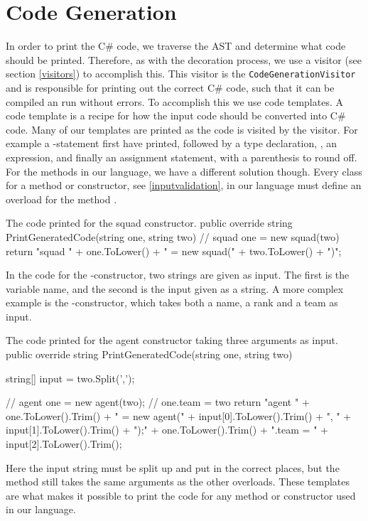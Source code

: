\section{Code Generation}
In order to print the C\# code, we traverse the AST and determine what code should be printed. 
Therefore, as with the decoration process, we use a visitor (see section \ref{visitors}) to accomplish this.
This visitor is the \texttt{CodeGenerationVisitor} and is responsible for printing out the correct C\# code, such that it can be compiled an run without errors. 
To accomplish this we use code templates. \newline
A code template is a recipe for how the input code should be converted into C\# code. 
Many of our templates are printed as the code is visited by the visitor. 
For example a -statement first have  printed, followed by a type declaration, , an expression,  and finally an assignment statement,  with a parenthesis to round off. \newline
For the methods in our language, we have a different solution though. 
Every class for a method or constructor, see \ref{inputvalidation}, in our language must define an overload for the method . 

\begin{source}{The code printed for the squad constructor.}{}
public override string PrintGeneratedCode(string one, string two)
        {
            // squad one = new squad(two)
            return "squad " + one.ToLower() + " = new squad(" + two.ToLower() + ")";
        }
\end{source}

In the code for the -constructor, two strings are given as input. 
The first is the variable name, and the second is the input given as a string. 
A more complex example is the -constructor, which takes both a name, a rank and a team as input.

\begin{source}{The code printed for the agent constructor taking three arguments as input.}{}
public override string PrintGeneratedCode(string one, string two)
        {
            string[] input = two.Split(',');
						
            // agent one = new agent(two);
            // one.team = two
            return "agent " + one.ToLower().Trim() + 
							" = new agent(" + input[0].ToLower().Trim() + 
							", " + input[1].ToLower().Trim() + ");\n" + 
							one.ToLower().Trim() + ".team = " + 
							input[2].ToLower().Trim();
        }
\end{source}

Here the input string must be split up and put in the correct places, but the method still takes the same arguments as the other overloads. 
These templates are what makes it possible to print the code for any method or constructor used in our language.